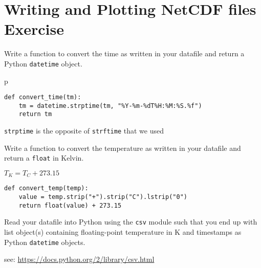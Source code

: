 \documentclass[a4paper,11pt]{article}
\begin{document}
\section{Writing and Plotting NetCDF files Exercise}
\begin{question}
Write a function to convert the time as written in
your datafile and return a Python \texttt{datetime}
object.
\end{question}p
\newsavebox\timeconv
\begin{lrbox}{\timeconv}
\begin{minipage}{\textwidth}
\begin{verbatim}
def convert_time(tm):
    tm = datetime.strptime(tm, "%Y-%m-%dT%H:%M:%S.%f")
    return tm
\end{verbatim}
\end{minipage}
\end{lrbox}
\begin{solution}
\noindent\usebox\timeconv

\texttt{strptime} is the opposite of \texttt{strftime} that we used
\end{solution}
\begin{question}
Write a function to convert the temperature as
written in your datafile and return a \texttt{float} in
Kelvin.

{\center $T_K = T_C + 273.15$}
\end{question}
\newsavebox\tempconv
\begin{lrbox}{\tempconv}
\begin{minipage}{\textwidth}
\begin{verbatim}
def convert_temp(temp):
    value = temp.strip("+").strip("C").lstrip("0")
    return float(value) + 273.15
\end{verbatim}
\end{minipage}
\end{lrbox}
\begin{solution}
\noindent\usebox\tempconv
\end{solution}
\begin{question}
Read your datafile into Python using the \texttt{csv} module such
that you end up with list object(s) containing floating-point
temperature in K and timestamps as Python \texttt{datetime} objects.


see: {\href{https://docs.python.org/2/library/csv.html}{https://docs.python.org/2/library/csv.html}}
\end{question}
\newsavebox\csvread
\end{document}
